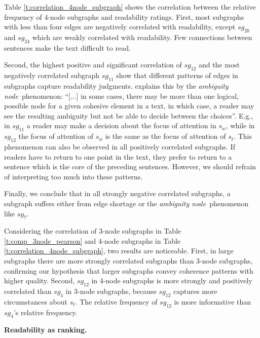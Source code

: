 Table \ref{t:correlation_4node_subgraph} shows the correlation between the relative frequency of 4-node subgraphs and readability ratings. 
First, most subgraphs with less than four edges are negatively correlated with readability, except $sg_{20}$ and $sg_{24}$ which are weakly correlated with readability. Few connections between sentences make the text difficult to read.

Second, the highest positive and significant correlation of $sg_{12}$ and the most negatively correlated subgraph $sg_{11}$ show that different patterns of edges in subgraphs capture readability judgments. 
 explains this by the \emph{ambiguity node}\ phenomenon: ``[...] in some cases, there may be more
than one logical, possible node for a given cohesive element in a text, in which case, a reader may see the resulting ambiguity but not be able to decide between the choices''. 
E.g., in $sg_{11}$ a reader may make a decision about the focus of attention in $s_w$, while in $sg_{12}$ the focus of attention of $s_w$ is the same as the
focus of attention of $s_t$. This phenomenon can also be observed in all positively correlated subgraphs. If readers have to return to one point in the text, they prefer to return to a sentence which is the core of the preceding sentences.
However, we should refrain of interpreting too much into these patterns.

Finally, we conclude that in all strongly negative correlated subgraphs, a subgraph suffers either from edge shortage or the \textit{ambiguity node}\ phenomenon like $sg_7$.

Considering the correlation of 3-node subgraphs in Table \ref{t:comp_3node_pearson} and 4-node subgraphs in Table \ref{t:correlation_4node_subgraph}, two results are noticeable.
First, in large subgraphs there are more strongly correlated subgraphs than 3-node subgraphs, confirming our hypothesis that larger subgraphs convey coherence patterns with higher quality. Second, $sg_{12}$ in 4-node subgraphs is more strongly and positively correlated than $sg_4$ in 3-node subgraphs, because $sg_{12}$ captures more circumstances about $s_t$. 
The relative frequency of $sg_{12}$ is more informative than $sg_4$'s relative frequency.

\noindent
\textbf{Readability as ranking.} 

